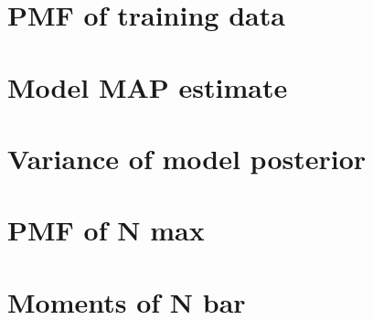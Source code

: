 \documentclass[12pt]{article}
\begin{document}
\section{PMF of training data}

\section{Model MAP estimate}

\section{Variance of model posterior}

\section{PMF of N max}

\section{Moments of N bar}
\end{document}

